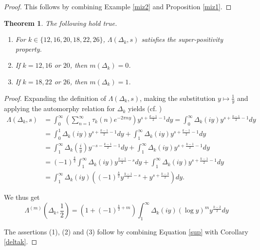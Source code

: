 \documentclass[12pt,reqno]{amsart}
\newtheorem{theorem}{Theorem}[section]
\theoremstyle{definition}
\numberwithin{equation}{section}
\begin{document}
\begin{proof}
This follows by combining Example \ref{miz2} and Proposition \ref{miz1}. 
\end{proof}





\begin{theorem} \label{superpositivity}
The following hold true. 

\begin{enumerate}

\item For $k \in \{12, 16, 20, 18, 22, 26\}$, $\Lambda(\Delta_k, s)$ satisfies the super-positivity property.  

\item If $k=12, 16$ or $20$, then $m(\Delta_k)=0$. %

\item If $k=18, 22$ or $26$, then $m(\Delta_k)=1$.  %

\end{enumerate}




\end{theorem}

\begin{proof}
Expanding the definition of $\Lambda(\Delta_k, s)$, making the substitution $y \mapsto \frac{1}{y}$ and applying the automorphy relation for $\Delta_k$ yields (cf. \cite[Theorem 9.7]{KKS12})
\begin{align*}
\Lambda(\Delta_k, s) &= \int_{0}^{\infty} \left(\sum_{n=1}^{\infty} \tau_k(n) e^{-2 \pi n y}  \right)y^{s+\frac{k-1}{2}-1} dy 
= \int_{0}^{\infty}  \Delta_k(iy) y^{s+\frac{k-1}{2}-1} dy \\
&=  \int_{0}^{1}  \Delta_k(iy) y^{s+\frac{k-1}{2}-1} dy +  \int_{1}^{\infty}  \Delta_k(iy) y^{s+\frac{k-1}{2}-1} dy  \\
&= \int_{1}^{\infty}  \Delta_k \left( \frac{i}{y} \right) y^{-s-\frac{k-1}{2}-1} dy +  \int_{1}^{\infty}  \Delta_k(iy) y^{s+\frac{k-1}{2}-1} dy  \\
&= (-1)^{\frac{k}{2}} \int_{1}^{\infty}  \Delta_k(iy) y^{\frac{k-1}{2}-s} dy +  \int_{1}^{\infty}  \Delta_k(iy) y^{s+\frac{k-1}{2}-1} dy   \\
&= \int_{1}^{\infty}  \Delta_k(iy) (  (-1)^{\frac{k}{2}} y^{\frac{k-1}{2}-s}+  y^{s+\frac{k-3}{2}} )dy. 
\end{align*}

We thus get
\begin{equation} \label{sup}
\Lambda^{(m)} \left (\Delta_k , \frac{1}{2} \right) = \left(1+(-1)^{\frac{k}{2}+m} \right)  \int_{1}^{\infty}  \Delta_k(iy) (\log y)^{m}    y^{\frac{k-2}{2}}dy 
\end{equation}

The assertions (1), (2) and (3) follow by combining Equation \eqref{sup} with Corollary \ref{deltak}.  \qedhere 

\end{proof}
\end{document}
